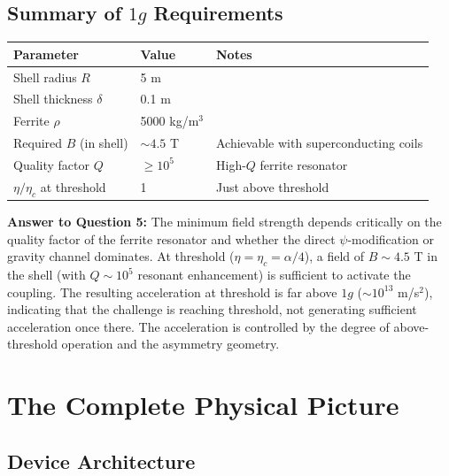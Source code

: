 \documentclass[12pt, letterpaper]{article}
\theoremstyle{definition}
\theoremstyle{remark}
\newcommand{\etac}{\eta_c}
\begin{document}
\subsection{Summary of $1g$ Requirements}

\begin{center}
\begin{tabular}{lll}
\hline
Parameter & Value & Notes \\
\hline
Shell radius $R$ & 5 m & \\
Shell thickness $\delta$ & 0.1 m & \\
Ferrite $\rho$ & 5000 kg/m$^3$ & \\
Required $B$ (in shell) & $\sim 4.5$ T & Achievable with superconducting coils \\
Quality factor $Q$ & $\geq 10^5$ & High-$Q$ ferrite resonator \\
$\eta/\etac$ at threshold & 1 & Just above threshold \\
\hline
\end{tabular}
\end{center}

\textbf{Answer to Question 5:} The minimum field strength depends critically
on the quality factor of the ferrite resonator and whether the direct
$\psi$-modification or gravity channel dominates. At threshold
($\eta = \etac = \alpha/4$), a field of $B \sim 4.5$ T in the shell
(with $Q \sim 10^5$ resonant enhancement) is sufficient to activate the
coupling. The resulting acceleration at threshold is far above $1g$
($\sim 10^{13}$ m/s$^2$), indicating that the challenge is reaching
threshold, not generating sufficient acceleration once there. The
acceleration is controlled by the degree of above-threshold operation and
the asymmetry geometry.

\section{The Complete Physical Picture}
\label{sec:summary}

\subsection{Device Architecture}
\end{document}
